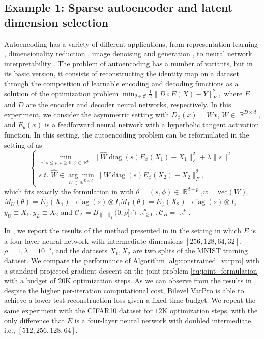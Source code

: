 \documentclass{article}
\DeclareMathOperator{\diag}{\mathrm{diag}}
\DeclareMathOperator{\R}{\mathbb{R}}
\newcommand{\algname}{Bilevel VarPro}
\begin{document}
\subsection{Example 1: Sparse autoencoder and latent dimension selection}

Autoencoding has a variety of different applications, from representation learning \cite{tschannen2018recentadvancesautoencoderbasedrepresentation}, dimensionality reduction \cite{hinton_autoencoder}, image denoising and generation \cite{bengio2013generalizeddenoisingautoencodersgenerative}, to neural network interpretability \cite{huben2024sparse,alain2017understanding}. The problem of autoencoding has a number of variants, but in its basic version, it consists of reconstructing the identity map on a dataset through the composition of learnable encoding and decoding functions as a solution of the optimization problem
$
\min_{\theta \in \mathcal C} \frac{1}{2} \| D \circ E(X)-Y \|_F^2,
$
where $E$ and $D$ are the encoder and decoder neural networks, respectively. In this experiment, we consider the asymmetric setting with $D_\phi(x) = Wx$, $W \in \R^{D \times d}$, and $E_{\theta}(x)$ is a feedforward neural network with a hyperbolic tangent activation function. In this setting, the autoencoding problem can be reformulated in the setting of  as
\begin{equation*}
    \begin{cases}
 \underset{e^\top s \leq \rho, s \geq 0,\phi \in \R^p}{\min} \| \widehat  W \diag(s) E_\phi(X_1) - X_1 \|_F^2   +\lambda \|s \|^2 \\
 s.t.\,\,\widehat  W \in \underset{W \in \R^{D \times d}}{\arg\min} \|W\diag(s) E_\phi(X_2) - X_2 \|_F^2,
\end{cases}
\end{equation*}
which fits exactly the formulation in  with $\theta = (s, \phi) \in \R^{d+p}$,$w = \mathrm{vec}(W)$, $M_U(\theta) = E_\phi(X_1)^\top \diag(s) \otimes I$,$M_L(\theta) = E_\phi(X_2)^\top \diag(s) \otimes I$, $y_U \equiv X_1, y_L \equiv X_2$ and $\mathcal C_A = B_{\|\cdot \|_1}(0,\rho] \cap \R^d_{\geq 0}, \mathcal C_B = \R^p$.

In , we report the results of the method presented in  in the setting in which $E$ is a four-layer neural network with intermediate dimensions $[256,128,64,32]$, $\rho = 1, \lambda = 10^{-5}$, and the datasets $X_1,X_2$ are two splits of the MNIST training dataset. We compare the performance of Algorithm \ref{alg:constrained_varpro} with a standard projected gradient descent on the joint problem \ref{eq:joint_formulation} with a budget of $20$K optimization steps. As we can observe from the results in , despite the higher per-iteration computational cost, \algname{} is able to achieve a lower test reconstruction loss given a fixed time budget. We repeat the same experiment with the CIFAR10 dataset for $12$K optimization steps, with the only difference that $E$ is a four-layer neural network with doubled intermediate, i.e., $[512,256,128,64]$.
\end{document}
